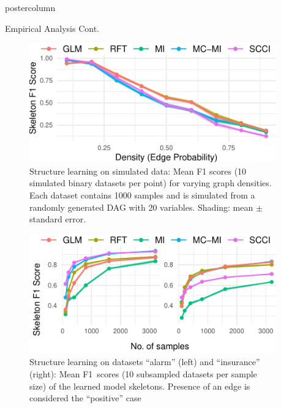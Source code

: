 \documentclass{beamer}
\newlength{\columnheight}
\begin{document}
\begin{frame}
\begin{columns}
\begin{column}{.33\textwidth}
	\end{column}
	\begin{column}{0.33\textwidth}
		\begin{beamercolorbox}[center]{postercolumn}
			\begin{minipage}{.98\textwidth} %
				\parbox[t][\columnheight]{\textwidth}{ %
					\begin{myblock}{Empirical Analysis Cont.}
						\begin{figure}
							\centering
							\includegraphics[scale=3]{../in_person/imgs/sl_density.pdf}
							\caption{Structure learning on simulated data: Mean F1 scores (10
								 simulated binary datasets per point) for varying graph densities. Each
								 dataset contains 1000 samples and is simulated from a randomly
								 generated DAG with 20 variables. Shading: mean $\pm$ standard error.}
							\label{fig:sl_density}
						\end{figure}
						\begin{figure}
							\centering
							\includegraphics[scale=3]{../in_person/imgs/sl.pdf}
							\caption{Structure learning on datasets ``alarm'' (left) and ``insurance'' (right):
								Mean F1~scores (10 subsampled datasets per sample size) of the learned
								model skeletons.  Presence of an edge is considered the ``positive'' case
}
\end{figure}
\end{myblock}}
\end{minipage}
\end{beamercolorbox}
\end{column}
\end{columns}
\end{frame}
\end{document}
